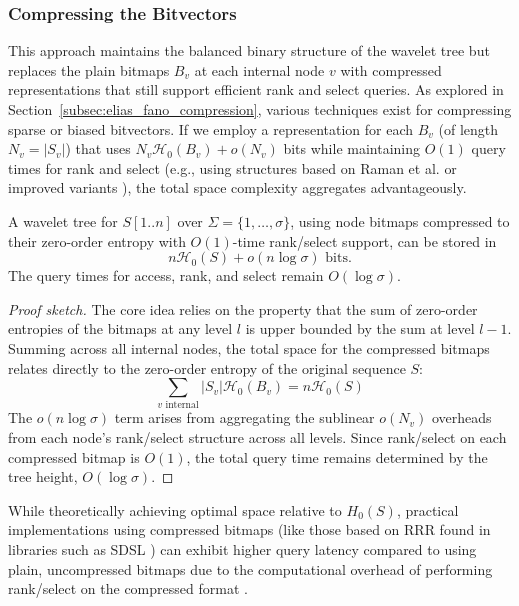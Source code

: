 \subsubsection{Compressing the Bitvectors} \label{subsec:compressing_bitvectors}

This approach maintains the balanced binary structure of the wavelet tree but replaces the plain bitmaps $B_v$ at each internal node $v$ with compressed representations that still support efficient \textsf{rank} and \textsf{select} queries. As explored in Section~\ref{subsec:elias_fano_compression}, various techniques exist for compressing sparse or biased bitvectors. If we employ a representation for each $B_v$ (of length $N_v = |S_v|$) that uses $N_v \mathcal{H}_0(B_v) + o(N_v)$ bits while maintaining $O(1)$ query times for \textsf{rank} and \textsf{select} (e.g., using structures based on Raman et al. \cite{RRR2002} or improved variants \cite{patrascu2008succincter}), the total space complexity aggregates advantageously.

\begin{theorem} \label{thm:h0_bitmap_wt_space}
    A wavelet tree for $S[1..n]$ over $\Sigma=\{1,\dots,\sigma\}$, using node bitmaps compressed to their zero-order entropy with $O(1)$-time rank/select support, can be stored in
    \[ n \mathcal{H}_0(S) + o(n \log \sigma) \text{ bits}. \]
    The query times for \textsf{access}, \textsf{rank}, and \textsf{select} remain $O(\log \sigma)$.
\end{theorem}
\begin{proof}[Proof sketch]
    The core idea relies on the property that the sum of zero-order entropies of the bitmaps at any level $l$ is upper bounded by the sum at level $l-1$. Summing across all internal nodes, the total space for the compressed bitmaps relates directly to the zero-order entropy of the original sequence $S$:
    \[\sum_{v \text{ internal}} |S_v| \mathcal{H}_0(B_v) = n \mathcal{H}_0(S)\]
    The $o(n \log \sigma)$ term arises from aggregating the sublinear $o(N_v)$ overheads from each node's rank/select structure across all levels. Since rank/select on each compressed bitmap is $O(1)$, the total query time remains determined by the tree height, $O(\log \sigma)$.
\end{proof}

While theoretically achieving optimal space relative to $H_0(S)$, practical implementations using compressed bitmaps (like those based on RRR found in libraries such as SDSL \cite{gog2014theory}) can exhibit higher query latency compared to using plain, uncompressed bitmaps due to the computational overhead of performing rank/select on the compressed format \cite{claude2015wavelet}.

